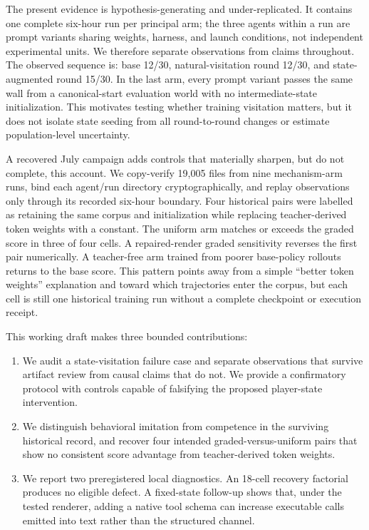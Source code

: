 \documentclass[11pt,a4paper]{article}
\begin{document}
The present evidence is hypothesis-generating and under-replicated. It contains
one complete six-hour run per principal arm; the three agents within a run are
prompt variants sharing weights, harness, and launch conditions, not independent
experimental units. We therefore separate observations from claims throughout.
The observed sequence is: base 12/30, natural-visitation round 12/30, and
state-augmented round 15/30. In the last arm, every prompt variant passes the
same wall from a canonical-start evaluation world with no intermediate-state
initialization. This motivates testing whether training visitation matters, but
it does not isolate state seeding from all
round-to-round changes or estimate population-level uncertainty.

A recovered July campaign adds controls that materially sharpen, but do not
complete, this account. We copy-verify 19,005 files from nine mechanism-arm
runs, bind each agent/run directory cryptographically, and replay observations
only through its recorded six-hour boundary. Four historical pairs were labelled
as retaining the same corpus and initialization while replacing teacher-derived
token weights with a constant. The uniform arm matches or exceeds the graded
score in three of four cells. A repaired-render graded sensitivity reverses the
first pair numerically. A teacher-free arm trained from poorer base-policy
rollouts returns to the base score. This pattern points away from a simple
``better token weights'' explanation and toward which trajectories enter the
corpus, but each cell is still one historical training run without a complete
checkpoint or execution receipt.

This working draft makes three bounded contributions:

\begin{enumerate}
  \item We audit a state-visitation failure case and separate observations that
  survive artifact review from causal claims that do not. We provide a
  confirmatory protocol with controls capable of falsifying the proposed
  player-state intervention.
  \item We distinguish behavioral imitation from competence in the surviving
  historical record, and recover four intended graded-versus-uniform pairs that
  show no consistent score advantage from teacher-derived token weights.
  \item We report two preregistered local diagnostics. An 18-cell recovery
  factorial produces no eligible defect. A fixed-state follow-up shows that,
  under the tested renderer, adding a native tool schema can increase
  executable calls emitted into text rather than the structured channel.
\end{enumerate}
\end{document}
